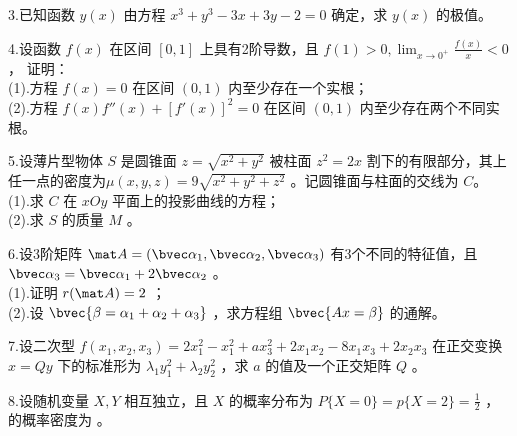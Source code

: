 3.已知函数 $y(x)$ 由方程 $x^3+y^3-3x+3y-2=0$  确定，求 $y(x)$ 的极值。

4.设函数  $f(x)$ 在区间 $[0,1]$  上具有2阶导数，且 $\displaystyle f(1)>0,\lim_{x \to 0^+}\frac{f(x)}{x}<0$ ，  证明：\\
(1).方程 $f(x)=0$  在区间 $(0,1)$ 内至少存在一个实根；\\
(2).方程 $f(x)f''(x)+[f'(x)]^2=0$ 在区间 $(0,1)$ 内至少存在两个不同实根。

5.设薄片型物体 $S$ 是圆锥面  $z=\sqrt{x^2+y^2}$ 被柱面 $z^2=2x$  割下的有限部分，其上任一点的密度为$\mu(x,y,z)=9\sqrt{x^2+y^2+z^2}$   。记圆锥面与柱面的交线为 $C$。\\
(1).求 $C$ 在 $xOy$  平面上的投影曲线的方程；\\
(2).求 $S$ 的质量 $M$ 。

6.设3阶矩阵 $\mat A=(\bvec \alpha_1,\bvec \alpha_2,\bvec \alpha_3)$  有3个不同的特征值，且 $\bvec \alpha_3=\bvec \alpha_1+2\bvec \alpha_2$ 。\\
(1).证明 $r(\mat A)=2$ ；\\
(2).设 $\bvec{\beta=\alpha_1+\alpha_2+\alpha_3}$  ，求方程组 $\bvec{Ax=\beta}$  的通解。

7.设二次型  $f(x_1,x_2,x_3)=2x_1^2-x_1^2+ax_3^2+2x_1x_2-8x_1x_3+2x_2x_3$ 在正交变换  $x=Qy$ 下的标准形为 $\lambda_1y_1^2+\lambda_2y_2^2$  ，求 $a$ 的值及一个正交矩阵 $Q$ 。

8.设随机变量 $X,Y$  相互独立，且 $X$  的概率分布为 $P\{X=0\}=p\{X=2\}=\frac{1}{2}$  ，  的概率密度为   。